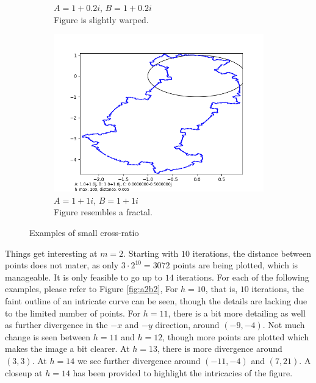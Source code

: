 \documentclass[12pt,a4paper,reqno,parskip=full]{amsart}
\numberwithin{equation}{section}
\theoremstyle{plain}
\theoremstyle{definition}
\begin{document}
\begin{figure}[H]
\begin{subfigure}[b]{0.3\textwidth}
         \caption{$A=1+0.2i$, $B=1+0.2i$\\Figure is slightly warped.}
         \label{fig:warped}
     \end{subfigure}
     \hfill
     \begin{subfigure}[b]{0.3\textwidth}
         \centering
         \includegraphics[width=\textwidth]{images/m/a1,b1,h100,d.005.png}
         \caption{$A=1+1i$, $B=1+1i$\\Figure resembles a fractal.}
         \label{fig:fractal}
     \end{subfigure}
        \caption{Examples of small cross-ratio}
        \label{fig:small CR}
\end{figure}

Things get interesting at $m=2$. Starting with $10$ iterations, the distance between points does not mater, as only $3\cdot2^{10}=3072$ points are being plotted, which is manageable. It is only feasible to go up to $14$ iterations.  For each of the following examples, please refer to Figure \ref{fig:a2b2}, For $h=10$, that is, $10$ iterations, the faint outline of an intricate curve can be seen, though the details are lacking due to the limited number of points. For $h=11$, there is a bit more detailing as well as further divergence in the $-x$ and $-y$ direction, around $(-9,-4)$. Not much change is seen between $h=11$ and $h=12$, though more points are plotted which makes the image a bit clearer. At $h=13$, there is more divergence around $(3,3)$. At $h=14$ we see further divergence around $(-11,-4)$ and $(7,21)$. A closeup at $h=14$ has been provided to highlight the intricacies of the figure. 
\end{document}
